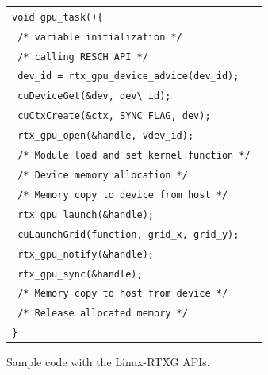 \begin{figure}[!t]
\begin{center}
\begin{tabular}{l}
\hline\hline
{\scriptsize \verb|void gpu_task(){        |}\\
{\scriptsize \verb| /* variable initialization */ |}\\
{\scriptsize \verb| /* calling RESCH API */ |}\\
{\scriptsize \verb| dev_id = rtx_gpu_device_advice(dev_id); |}\\
{\scriptsize \verb| cuDeviceGet(&dev, dev\_id); |}\\
{\scriptsize \verb| cuCtxCreate(&ctx, SYNC_FLAG, dev); |}\\
{\scriptsize \verb| rtx_gpu_open(&handle, vdev_id); |}\\
{\scriptsize \verb| /* Module load and set kernel function */ |}\\
{\scriptsize \verb| /* Device memory allocation */ |}\\
{\scriptsize \verb| /* Memory copy to device from host */ |}\\
{\scriptsize \verb| rtx_gpu_launch(&handle); |}\\
{\scriptsize \verb| cuLaunchGrid(function, grid_x, grid_y); |}\\
{\scriptsize \verb| rtx_gpu_notify(&handle); |}\\
{\scriptsize \verb| rtx_gpu_sync(&handle); |}\\
{\scriptsize \verb| /* Memory copy to host from device */ |}\\
{\scriptsize \verb| /* Release allocated memory */ |}\\
{\scriptsize \verb|}|}\\
\hline\hline
\end{tabular}
\caption{Sample code with the Linux-RTXG APIs.}
\label{fig:sample}
\end{center}
\end{figure}

